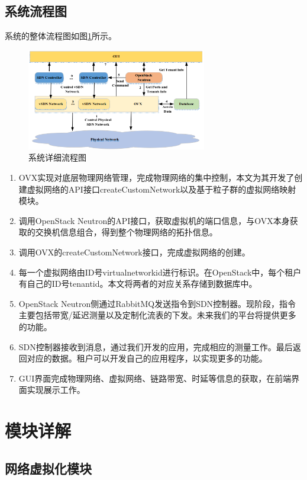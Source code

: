 \subsection{系统流程图}
系统的整体流程图如图\ref{fig:workflow}所示。

\begin{figure}[!htb]
  \centering
  \includegraphics[width=0.7\textwidth]{logo/workflow.png}
  \caption{系统详细流程图}
  \label{fig:workflow}
\end{figure}

\begin{enumerate}
\item OVX实现对底层物理网络管理，完成物理网络的集中控制，本文为其开发了创建虚拟网络的API接口createCustomNetwork以及基于粒子群的虚拟网络映射模块。
\item 调用OpenStack Neutron的API接口，获取虚拟机的端口信息，与OVX本身获取的交换机信息组合，得到整个物理网络的拓扑信息。
\item 调用OVX的createCustomNetwork接口，完成虚拟网络的创建。
\item 每一个虚拟网络由ID号virtualnetworkid进行标识。在OpenStack中，每个租户有自己的ID号tenantid。本文将两者的对应关系存储到数据库中。
\item OpenStack Neutron侧通过RabbitMQ发送指令到SDN控制器。现阶段，指令主要包括带宽/延迟测量以及定制化流表的下发。未来我们的平台将提供更多的功能。
\item SDN控制器接收到消息，通过我们开发的应用，完成相应的测量工作。最后返回对应的数据。租户可以开发自己的应用程序，以实现更多的功能。
\item GUI界面完成物理网络、虚拟网络、链路带宽、时延等信息的获取，在前端界面实现展示工作。
\end{enumerate}

\section{模块详解}
\subsection{网络虚拟化模块}

